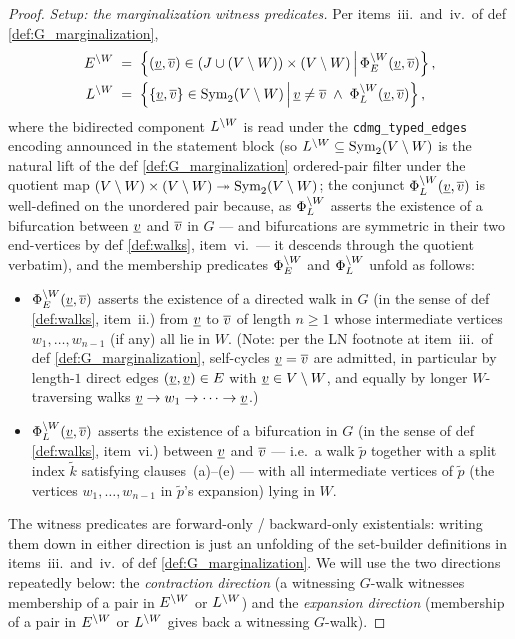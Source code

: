 \documentclass[main]{subfiles}
\begin{document}
\begin{proof}
\medskip\noindent\emph{Setup: the marginalization witness predicates.}
Per items~iii.\ and~iv.\ of def \ref{def:G_marginalization},
\begin{align*}
    E^{\setminus W} \;&=\; \left \{ (\underline{v}, \overline{v}) \in (J \cup (V \setminus W)) \times (V \setminus W) \,\middle|\, \Phi_E^{\setminus W}(\underline{v}, \overline{v}) \right \},\\
    L^{\setminus W} \;&=\; \left \{ \left \{ \underline{v}, \overline{v} \right \} \in \text{Sym}_2(V \setminus W) \,\middle|\, \underline{v} \neq \overline{v} \;\wedge\; \Phi_L^{\setminus W}(\underline{v}, \overline{v}) \right \},
\end{align*}
where the bidirected component $L^{\setminus W}$ is read under the \texttt{cdmg\_typed\_edges} encoding announced in the statement block (so $L^{\setminus W} \subseteq \text{Sym}_2(V \setminus W)$ is the natural lift of the def \ref{def:G_marginalization} ordered-pair filter under the quotient map $(V \setminus W) \times (V \setminus W) \twoheadrightarrow \text{Sym}_2(V \setminus W)$; the conjunct $\Phi_L^{\setminus W}(\underline{v}, \overline{v})$ is well-defined on the unordered pair because, as $\Phi_L^{\setminus W}$ asserts the existence of a bifurcation between $\underline{v}$ and $\overline{v}$ in $G$ --- and bifurcations are symmetric in their two end-vertices by def \ref{def:walks}, item~vi.\ --- it descends through the quotient verbatim), and the membership predicates $\Phi_E^{\setminus W}$ and $\Phi_L^{\setminus W}$ unfold as follows:
\begin{itemize}
    \item $\Phi_E^{\setminus W}(\underline{v}, \overline{v})$ asserts the existence of a directed walk in $G$ (in the sense of def \ref{def:walks}, item~ii.) from $\underline{v}$ to $\overline{v}$ of length $n \ge 1$ whose intermediate vertices $w_1, \dots, w_{n-1}$ (if any) all lie in $W$. (Note: per the LN footnote at item~iii.\ of def \ref{def:G_marginalization}, self-cycles $\underline{v} = \overline{v}$ are admitted, in particular by length-$1$ direct edges $(\underline{v}, \underline{v}) \in E$ with $\underline{v} \in V \setminus W$, and equally by longer $W$-traversing walks $\underline{v} \to w_1 \to \dots \to \underline{v}$.)
    \item $\Phi_L^{\setminus W}(\underline{v}, \overline{v})$ asserts the existence of a bifurcation in $G$ (in the sense of def \ref{def:walks}, item~vi.) between $\underline{v}$ and $\overline{v}$ --- i.e.\ a walk $\tilde{p}$ together with a split index $\tilde{k}$ satisfying clauses~(a)--(e) --- with all intermediate vertices of $\tilde{p}$ (the vertices $w_1, \dots, w_{n-1}$ in $\tilde{p}$'s expansion) lying in $W$.
\end{itemize}
The witness predicates are forward-only / backward-only existentials: writing them down in either direction is just an unfolding of the set-builder definitions in items~iii.\ and~iv.\ of def \ref{def:G_marginalization}. We will use the two directions repeatedly below: the \emph{contraction direction} (a witnessing $G$-walk witnesses membership of a pair in $E^{\setminus W}$ or $L^{\setminus W}$) and the \emph{expansion direction} (membership of a pair in $E^{\setminus W}$ or $L^{\setminus W}$ gives back a witnessing $G$-walk).


\end{proof}
\end{document}
